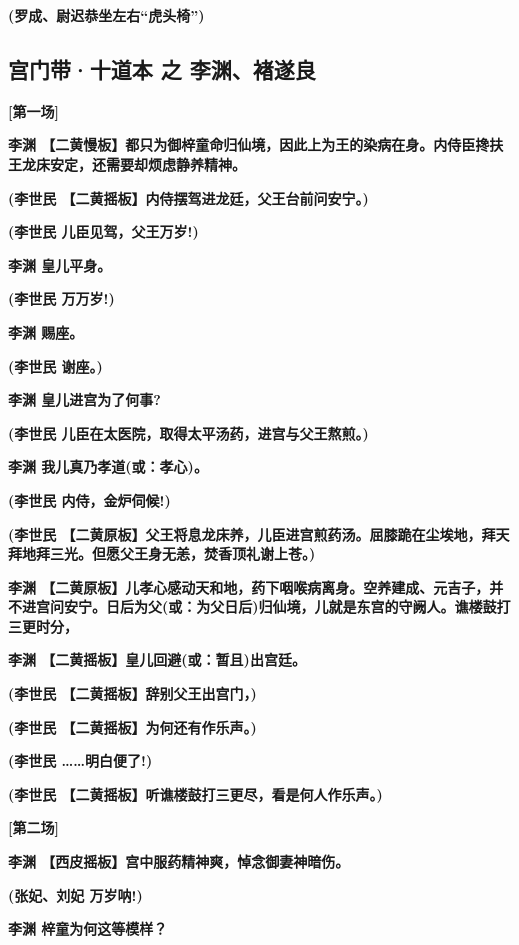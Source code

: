 \textbf{(罗成、尉迟恭坐左右``虎头椅'')}

\hypertarget{ux5babux95e8ux5e26ux5341ux9053ux672c-ux4e4b-ux674eux6e0aux891aux9042ux826f}{%
\subsection{宫门带·十道本 之
李渊、褚遂良}\label{ux5babux95e8ux5e26ux5341ux9053ux672c-ux4e4b-ux674eux6e0aux891aux9042ux826f}}

\textbf{{[}第一场{]}}

\textbf{李渊
【二黄慢板】都只为御梓童命归仙境，因此上为王的染病在身。内侍臣搀扶王龙床安定，还需要却烦虑静养精神。}

\textbf{(李世民 【二黄摇板】内侍摆驾进龙廷，父王台前问安宁。)}

\textbf{(李世民 儿臣见驾，父王万岁!)}

\textbf{李渊 皇儿平身。}

\textbf{(李世民 万万岁!)}

\textbf{李渊 赐座。}

\textbf{(李世民 谢座。)}

\textbf{李渊 皇儿进宫为了何事?}

\textbf{(李世民 儿臣在太医院，取得太平汤药，进宫与父王熬煎。)}

\textbf{李渊 我儿真乃孝道(或：孝心)。}

\textbf{(李世民 内侍，金炉伺候!)}

\textbf{(李世民
【二黄原板】父王将息龙床养，儿臣进宫煎药汤。屈膝跪在尘埃地，拜天拜地拜三光。但愿父王身无恙，焚香顶礼谢上苍。)}

\textbf{李渊
【二黄原板】儿孝心感动天和地，药下咽喉病离身。空养建成、元吉子，并不进宫问安宁。日后为父(或：为父日后)归仙境，儿就是东宫的守阙人。谯楼鼓打三更时分，}

\textbf{李渊 【二黄摇板】皇儿回避(或：暂且)出宫廷。}

\textbf{(李世民 【二黄摇板】辞别父王出宫门，)}

\textbf{(李世民 【二黄摇板】为何还有作乐声。)}

\textbf{(李世民 \ldots{}\ldots{}明白便了!)}

\textbf{(李世民 【二黄摇板】听谯楼鼓打三更尽，看是何人作乐声。)}

\textbf{{[}第二场{]}}

\textbf{李渊 【西皮摇板】宫中服药精神爽，悼念御妻神暗伤。}

\textbf{(张妃、刘妃 万岁呐!)}

\textbf{李渊 梓童为何这等模样？}

